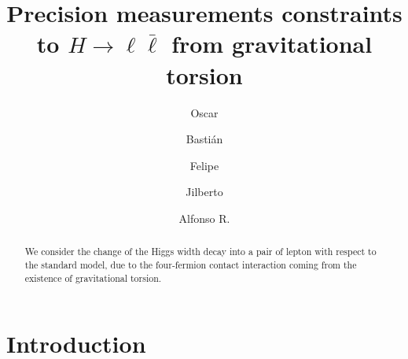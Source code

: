 \documentclass[twocolumn,aps,prd,showkeys,showpacs,groupedaddress]{revtex4-1}
\begin{document}
\title{Precision measurements constraints to $H \to \ell \bar{\ell}$ from gravitational torsion}

\author{Oscar }
\author{Basti\'an }
\author{Felipe }
\author{Jilberto }
\author{Alfonso R. }
\affiliation{\UTFSM,}

\begin{abstract}
  We consider the change of the Higgs width decay into a pair of lepton with respect to the standard model, due to the four-fermion contact interaction coming from the existence of gravitational torsion.
\end{abstract}



\maketitle

\section{\label{intro}Introduction}




\end{document}
